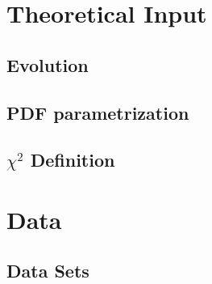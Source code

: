 \documentclass[12pt,a4paper,dvips]{article}
\begin{document}
\section{Theoretical Input}
\label{sec:theory}
%
\subsection{Evolution}
 
%
\subsection{PDF parametrization}

\subsection{$\chi^2$ Definition}
 
%
%
\section{Data}
\label{sec:data}
%
\subsection{Data Sets}

%
%
%
\end{document}
